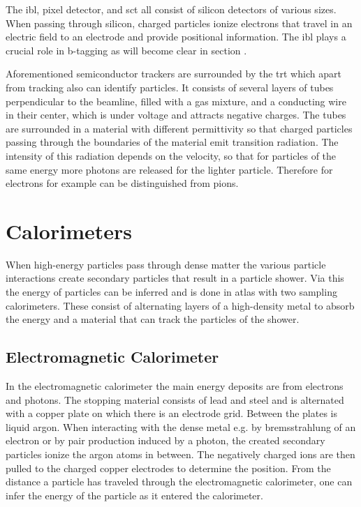 The \ac{ibl}, pixel detector, and \ac{sct} all consist of silicon detectors of various sizes. When passing through silicon, charged particles ionize electrons that travel in an electric field to an electrode and provide positional information. The \ac{ibl} plays a crucial role in b-tagging as will become clear in section .

Aforementioned semiconductor trackers are surrounded by the \ac{trt} which apart from tracking also can identify particles. It consists of several layers of tubes perpendicular to the beamline, filled with a gas mixture, and a conducting wire in their center, which is under voltage and attracts negative charges. The tubes are surrounded in a material with different permittivity so that charged particles passing through the boundaries of the material emit transition radiation. The intensity of this radiation depends on the velocity, so that for particles of the same energy more photons are released for the lighter particle. Therefore for electrons for example can be distinguished from pions.

\section{Calorimeters}

When high-energy particles pass through dense matter the various particle interactions create secondary particles that result in a particle shower. Via this the energy of particles can be inferred and is done in \ac{atlas} with two sampling calorimeters. These consist of alternating layers of a high-density metal to absorb the energy and a material that can track the particles of the shower. 

\subsection*{Electromagnetic Calorimeter}
 
In the electromagnetic calorimeter the main energy deposits are from electrons and photons. The stopping material consists of lead and steel and is alternated with a copper plate on which there is an electrode grid. Between the plates is liquid argon. When interacting with the dense metal e.g. by bremsstrahlung of an electron or by pair production induced by a photon, the created secondary particles ionize the argon atoms in between. The negatively charged ions are then pulled to the charged copper electrodes to determine the position. From the distance a particle has traveled through the electromagnetic calorimeter, one can infer the energy of the particle as it entered the calorimeter.

